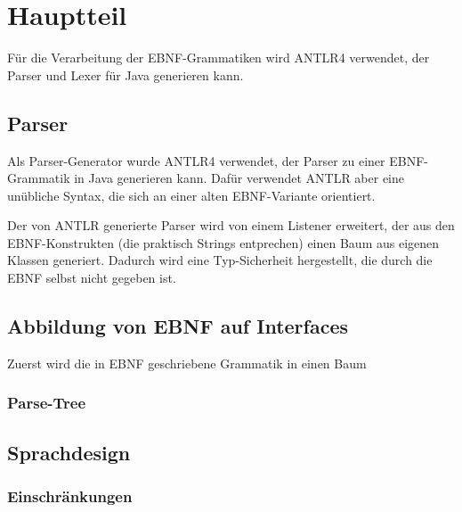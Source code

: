 \documentclass[../InterneDSLs.tex]{subfiles}
\begin{document}
\section{Hauptteil}
Für die Verarbeitung der \ac{EBNF}-Grammatiken wird ANTLR4 verwendet, der Parser und Lexer für Java generieren kann.

\subsection{Parser}
Als Parser-Generator wurde ANTLR4 verwendet, der Parser zu einer EBNF-Grammatik in Java generieren kann. Dafür verwendet ANTLR aber eine unübliche Syntax, die sich an einer alten EBNF-Variante orientiert.

Der von ANTLR generierte Parser wird von einem Listener erweitert, der aus den EBNF-Konstrukten (die praktisch Strings entprechen) einen Baum aus eigenen Klassen generiert. Dadurch wird eine Typ-Sicherheit hergestellt, die durch die EBNF selbst nicht gegeben ist.

\subsection{Abbildung von EBNF auf Interfaces}
Zuerst wird die in EBNF geschriebene Grammatik in einen Baum

\subsubsection{Parse-Tree}

\subsection{Sprachdesign}


\subsubsection{Einschränkungen}
\end{document}
